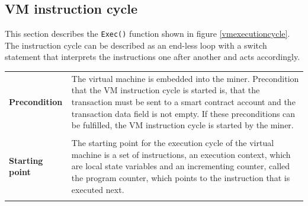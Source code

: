 \subsection{VM instruction cycle} \label{exec_cycle}
This section describes the \texttt{Exec()} function shown in figure \ref{vmexecutioncycle}. The instruction cycle can be described as an end-less loop with a switch statement that interprets the instructions one after another and acts accordingly.

\begin{tabular}[t]{ p{3cm} p{12.5cm}}
\raggedright
\textbf{Precondition} & 
The virtual machine is embedded into the miner. Precondition that the VM instruction cycle is started is, that the transaction must be sent to a smart contract account and the transaction data field is not empty. If these preconditions can be fulfilled, the VM instruction cycle is started by the miner. \\ \\

\raggedright
\textbf{Starting point} & 
The starting point for the execution cycle of the virtual machine is a set of instructions, an execution context, which are local state variables and an incrementing counter, called the program counter, which points to the instruction that is executed next. \\ \\


\end{tabular}
